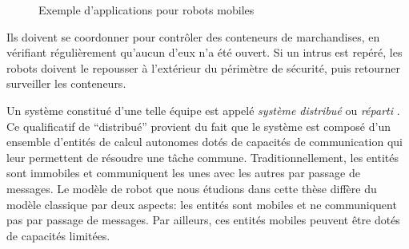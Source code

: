 \begin{figure}[h]
\caption{Exemple d'applications pour robots mobiles}
\label{fig:port:resume}
\end{figure}
Ils doivent se coordonner pour contrôler des
conteneurs de marchandises, en vérifiant régulièrement qu'aucun d'eux
n'a été ouvert. Si un intrus est repéré, les robots doivent le
repousser à l'extérieur du périmètre de sécurité, puis retourner
surveiller les conteneurs. 

Un système constitué d'une telle équipe est appelé \emph{système
  distribué} ou \emph{réparti} \cite{Lynch96,Tel:2001:IDA:517021}. Ce
qualificatif de ``distribué'' provient du fait que le système est
composé d'un ensemble d'entités de calcul autonomes dotés de capacités
de communication qui leur permettent de résoudre une tâche commune.
Traditionnellement, les entités sont immobiles et communiquent les
unes avec les autres par passage de messages.  Le modèle de robot que
nous étudions dans cette thèse diffère du modèle classique par deux
aspects: les entités sont mobiles et ne communiquent pas par passage
de messages. Par ailleurs, ces entités mobiles peuvent être dotés de
capacités limitées.


